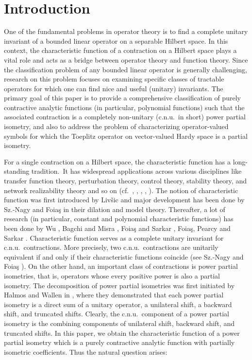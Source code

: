 \documentclass[12pt]{amsart}
\theoremstyle{definition}
\theoremstyle{plain}
\theoremstyle{definition}
\numberwithin{equation}{section}
\begin{document}
\section{Introduction}
One of the fundamental problems in operator theory is to find a complete unitary invariant of a bounded linear operator on a separable Hilbert space. In this context, the characteristic function of a contraction on a Hilbert space plays a vital role and acts as a bridge between operator theory and function theory. 
Since the classification problem of any bounded linear operator is generally challenging, research on this problem focuses on examining specific classes of tractable operators for which one can find nice and useful (unitary) invariants. The primary goal of this paper is to provide a comprehensive classification of purely contractive analytic functions (in particular, polynomial functions) such that the associated contraction is a completely non-unitary (c.n.u.\ in short) power partial isometry, and also to address the problem of  characterizing operator-valued symbols for which the Toeplitz operator on vector-valued Hardy space is a partial isometry.


 

For a single contraction on a Hilbert space, the characteristic function has a long-standing tradition.\ It has widespread applications across various disciplines like transfer function theory, perturbation theory, control theory, stability theory, and network realizability theory and so on (cf.\ \cite{Bercovici}, \cite{GKrein}, \cite{livsic2}, \cite{sznagy}, \cite{Helton}). The notion of characteristic function was first introduced by Liv\v{s}ic \cite{livsic} and major development has been done by Sz.-Nagy and Foia\c{s} \cite{sznagy} in their dilation and model theory. Thereafter, a lot of research (in particular, constant and polynomial characteristic functions) has been done by Wu \cite{PYW}, Bagchi and Misra \cite{GM}, Foia\c{s} and Sarkar \cite{foias}, Foia\c{s}, Pearcy and Sarkar \cite{foias2}. Characteristic function serves as a complete unitary invariant for c.n.u.\ contractions. More precisely, two c.n.u.\ contractions are unitarily equivalent if and only if their characteristic functions coincide (see Sz.-Nagy and Foia\c{s} \cite{sznagy}). On the other hand, an important class of contractions is power partial isometries, that is, operators whose every positive power is also a partial isometry. The decomposition of power partial isometries was first initiated by Halmos and Wallen in \cite{halmospowers}, where they demonstrated that each power partial isometry is a direct sum of a unitary operator, a unilateral shift, a backward shift, and truncated shifts. Clearly, the c.n.u.\ component of a power partial isometry is the combining components of unilateral shift, backward shift, and truncated shifts. In this paper, we obtain the characteristic function of a power partial isometry which is a purely contractive analytic function with partially isometric coefficients. Thus the natural question arises: 
\end{document}
